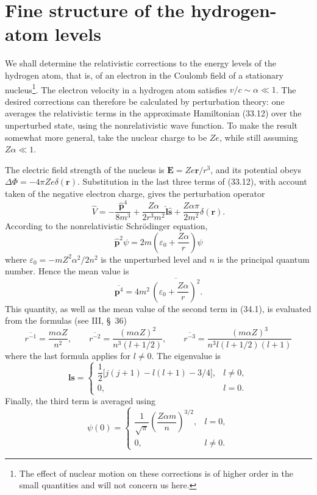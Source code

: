 
\section{Fine structure of the hydrogen-atom levels}

We shall determine the relativistic corrections to the energy levels of the hydrogen atom, that is, of an electron in the Coulomb field of a stationary nucleus\footnote{The effect of nuclear motion on these corrections is of higher order in the small quantities and will not concern us here.}. The electron velocity in a hydrogen atom satisfies $v/c\sim\alpha\ll1$. The desired corrections can therefore be calculated by perturbation theory: one averages the relativistic terms in the approximate Hamiltonian (33.12) over the unperturbed state, using the nonrelativistic wave function. To make the result somewhat more general, take the nuclear charge to be $Ze$, while still assuming $Z\alpha\ll1$.

The electric field strength of the nucleus is $\mathbf E=Ze\mathbf r/r^3$, and its potential obeys $\Delta\Phi=-4\pi Ze\delta(\mathbf r)$. Substitution in the last three terms of (33.12), with account taken of the negative electron charge, gives the perturbation operator
\begin{equation}
\widehat V=-\frac{\widehat{\mathbf p}^{4}}{8m^3}
+\frac{Z\alpha}{2r^3m^2}\widehat{\mathbf l}\widehat{\mathbf s}
+\frac{Z\alpha\pi}{2m^2}\delta(\mathbf r).
\tag{34.1}
\end{equation}
According to the nonrelativistic Schrödinger equation,
\[
\widehat{\mathbf p}^{2}\psi
=2m\left(\varepsilon_0+\frac{Z\alpha}{r}\right)\psi
\]
where $\varepsilon_0=-mZ^2\alpha^2/2n^2$ is the unperturbed level and $n$ is the principal quantum number. Hence the mean value is
\[
\overline{\mathbf p^4}=4m^2\,\overline{\left(\varepsilon_0+\frac{Z\alpha}{r}\right)^2}.
\]
This quantity, as well as the mean value of the second term in (34.1), is evaluated from the formulas (see III, \S~36)
\begin{equation}
\overline{r^{-1}}=\frac{m\alpha Z}{n^2},
\qquad
\overline{r^{-2}}=\frac{(m\alpha Z)^2}{n^3(l+1/2)},
\qquad
\overline{r^{-3}}=\frac{(m\alpha Z)^3}{n^3l(l+1/2)(l+1)}
\tag{34.2}
\end{equation}
where the last formula applies for $l\ne0$. The eigenvalue is
\[
\mathbf l\mathbf s=
\begin{cases}
\dfrac12\bigl[j(j+1)-l(l+1)-3/4\bigr],&l\ne0,\\[4pt]
0,&l=0.
\end{cases}
\]
Finally, the third term is averaged using
\begin{equation}
\psi(0)=
\begin{cases}
\dfrac{1}{\sqrt\pi}\left(\dfrac{Z\alpha m}{n}\right)^{3/2},&l=0,\\[5pt]
0,&l\ne0.
\end{cases}
\tag{34.3}
\end{equation}

